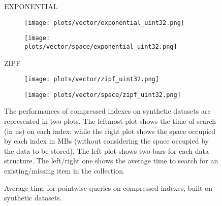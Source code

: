 \documentclass{article}
\begin{document}
\begin{figure}[!htbp]
{\begin{minipage}[t][0.98\textheight][t]{\textwidth}
    \begin{minipage}{0.03\linewidth}
    \begin{sideways}\small EXPONENTIAL\end{sideways}
    \end{minipage}
    \begin{minipage}{0.32\linewidth}
        \begin{figure}[H]
        \texttt{[image: plots/vector/exponential\_uint32.png]}
        \end{figure}
    \end{minipage}
    \begin{minipage}{0.32\linewidth}
        \begin{figure}[H]
            \texttt{[image: plots/vector/space/exponential\_uint32.png]}
        \end{figure}
    \end{minipage}
    \vspace*{-15px}

    \begin{minipage}{0.03\linewidth}
    \begin{sideways}\small ZIPF\end{sideways}
    \end{minipage}
    \begin{minipage}{0.32\linewidth}
        \begin{figure}[H]
        \texttt{[image: plots/vector/zipf\_uint32.png]}
        \end{figure}
    \end{minipage}
    \begin{minipage}{0.32\linewidth}
        \begin{figure}[H]
            \texttt{[image: plots/vector/space/zipf\_uint32.png]}
        \end{figure}
    \end{minipage}

    \vfill
    \centering
    \begin{minipage}{\linewidth}
The performances of compressed indexes on synthetic datasets are represented in two plots. The leftmost plot shows the time of search (in ns) on each index; while the right plot shows the space occupied by each index in MBs (without considering the space occupied by the data to be stored). The left plot shows two bars for each data structure. The left/right one shows the average time to search for an existing/missing item in the collection.
    \end{minipage}
    \vspace{10px}
\end{minipage}
}
\caption{Average time for pointwise queries on compressed indexes, built on synthetic datasets.}
\end{figure}
\end{document}
